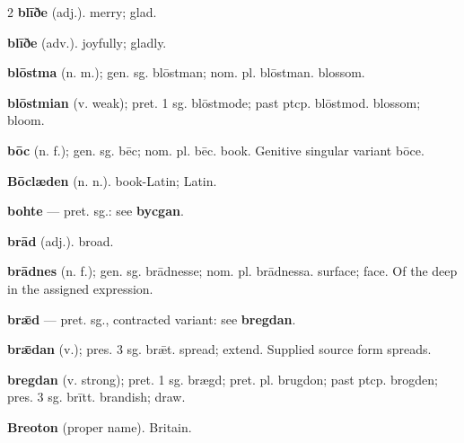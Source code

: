 \begin{multicols*}{2}
\textbf{blīðe} (adj.). merry; glad.\par
\textbf{blīðe} (adv.). joyfully; gladly.\par
\textbf{blōstma} (n. m.); gen. sg. blōstman; nom. pl. blōstman. blossom.\par
\textbf{blōstmian} (v. weak); pret. 1 sg. blōstmode; past ptcp. blōstmod. blossom; bloom.\par
\textbf{bōc} (n. f.); gen. sg. bēc; nom. pl. bēc. book. Genitive singular variant bōce.\par
\textbf{Bōclæden} (n. n.). book-Latin; Latin.\par
\textbf{bohte} — pret. sg.: see \textbf{bycgan}.\par
\textbf{brād} (adj.). broad.\par
\textbf{brādnes} (n. f.); gen. sg. brādnesse; nom. pl. brādnessa. surface; face. Of the deep in the assigned expression.\par
\textbf{brǣd} — pret. sg., contracted variant: see \textbf{bregdan}.\par
\textbf{brǣdan} (v.); pres. 3 sg. brǣt. spread; extend. Supplied source form spreads.\par
\textbf{bregdan} (v. strong); pret. 1 sg. brægd; pret. pl. brugdon; past ptcp. brogden; pres. 3 sg. brītt. brandish; draw.\par
\textbf{Breoton} (proper name). Britain.\par

\end{multicols*}
